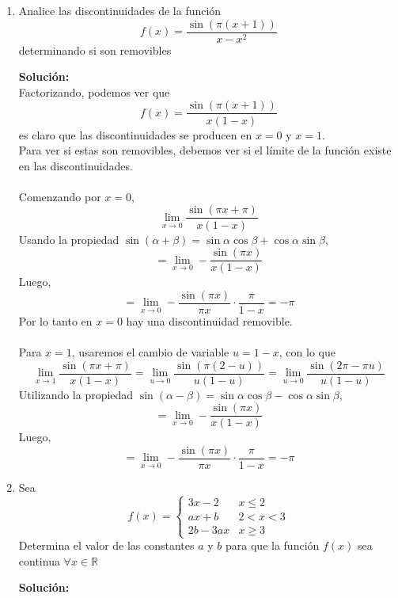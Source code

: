 \documentclass[12pt]{article}
\newenvironment{solucion}
{\begin{mdframed}[backgroundcolor=black!10]
		{\bf Solución:}\\
	}
	{
	\end{mdframed}
}
\newenvironment{preguntas}
{\begin{enumerate}\itemsep12pt
	}
	{
	\end{enumerate}
}
\newcommand{\ra}{\rightarrow}
\newcommand{\R}{\mathbb{R}}
\begin{document}
\begin{preguntas}
\begin{solucion}
\begin{enumerate}[a)]
$$\lim\limits_{u \ra 0} u \tan \left(\dfrac{\pi}{2} - u \right) =
\lim\limits_{u \ra 0} u \tan u =
0$$
\item $\lim\limits_{x \ra \pi} \dfrac{(x - \pi)^2}{\sin ^2 x}$ \\
\\
De manera análoga, usaremos el cambio de variable $u = \pi - x$, con lo que
$$\lim\limits_{x \ra \pi} \dfrac{(x - \pi)^2}{\sin ^2 x} = 
\lim\limits_{u \ra 0} \dfrac{u^2}{(\sin (\pi + u))^2} = 
\lim\limits_{u \ra 0} \dfrac{u^2}{(-\sin u)^2} =  
\lim\limits_{u \ra 0} \dfrac{1}{\left(\dfrac{\sin u}{u}\right)^2} = 1$$
\end{enumerate}
\end{solucion}
\item Analice las discontinuidades de la función
$$ f(x) = \dfrac{\sin(\pi(x+1))}{x-x^2} $$
determinando si son removibles
\begin{solucion}
Factorizando, podemos ver que
$$ f(x) = \dfrac{\sin(\pi(x+1))}{x(1-x)} $$
es claro que las discontinuidades se producen en $x=0$ y $x=1$.\\
Para ver si estas son removibles, debemos ver si el límite de la función existe en las discontinuidades.\\\\
Comenzando por $x=0$,
$$\lim\limits_{x \ra 0} \dfrac{\sin(\pi x+ \pi)}{x(1-x)}$$
Usando la propiedad $\sin (\alpha + \beta) = \sin \alpha \cos \beta + \cos \alpha \sin \beta$,
$$=\lim\limits_{x \ra 0} -\dfrac{\sin(\pi x)}{x(1-x)}$$
Luego,
$$=\lim\limits_{x \ra 0} -\dfrac{\sin(\pi x)}{\pi x} \cdot \dfrac{\pi}{1-x} = 
-\pi$$
Por lo tanto en $x=0$ hay una discontinuidad removible.\\
\\
Para $x=1$, usaremos el cambio de variable $u=1-x$, con lo que
$$\lim\limits_{x \ra 1} \dfrac{\sin(\pi x+ \pi)}{x(1-x)} =
\lim\limits_{u \ra 0} \dfrac{\sin(\pi (2-u))}{u(1-u)} =
\lim\limits_{u \ra 0} \dfrac{\sin(2\pi - \pi u)}{u(1-u)}$$
Utilizando la propiedad $\sin (\alpha - \beta) = \sin \alpha \cos \beta - \cos \alpha \sin \beta$,
$$=\lim\limits_{x \ra 0} -\dfrac{\sin(\pi x)}{x(1-x)}$$
Luego,
$$=\lim\limits_{x \ra 0} -\dfrac{\sin(\pi x)}{\pi x} \cdot \dfrac{\pi}{1-x} = 
-\pi$$
\end{solucion}
\item Sea 
$$f(x) = \begin{cases}
3x - 2 & x \leq 2\\
ax+b & 2 < x < 3 \\
2b-3ax & x \geq 3
\end{cases}$$
Determina el valor de las constantes $a$ y $b$ para que la función $f(x)$ sea continua $\forall x \in \R$
\begin{solucion}


\end{solucion}
\end{preguntas}
\end{document}
